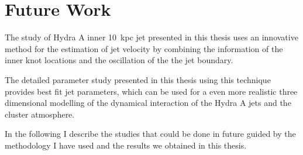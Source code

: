 \chapter{Future Work}\label{future_work}
The study of Hydra A inner 10~kpc jet presented in this thesis uses an innovative method for the estimation of jet velocity by combining the information of the inner knot locations and the oscillation of the the jet boundary.

The detailed parameter study presented in this thesis using this technique provides best fit jet parameters, which can be used for a even more realistic three dimensional modelling of the dynamical interaction of the Hydra A jets and the cluster atmosphere.

In the following I describe the studies that could be done in future guided by the methodology I have used and the results we obtained in this thesis.

